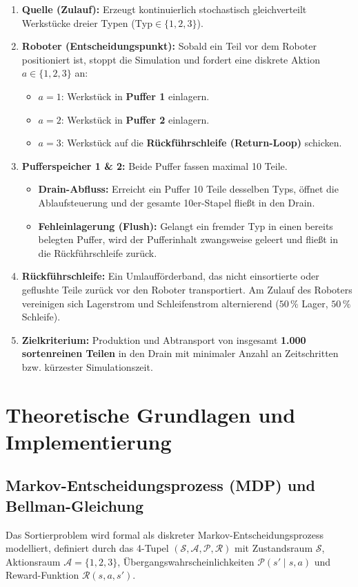 \documentclass[11pt,a4paper]{article}
\begin{document}
\begin{enumerate}
  \item \textbf{Quelle (Zulauf):} Erzeugt kontinuierlich stochastisch gleichverteilt Werkstücke dreier Typen ($\text{Typ} \in \{1, 2, 3\}$).
  \item \textbf{Roboter (Entscheidungspunkt):} Sobald ein Teil vor dem Roboter positioniert ist, stoppt die Simulation und fordert eine diskrete Aktion $a \in \{1, 2, 3\}$ an:
    \begin{itemize}
      \item $a=1$: Werkstück in \textbf{Puffer 1} einlagern.
      \item $a=2$: Werkstück in \textbf{Puffer 2} einlagern.
      \item $a=3$: Werkstück auf die \textbf{Rückführschleife (Return-Loop)} schicken.
    \end{itemize}
  \item \textbf{Pufferspeicher 1 \& 2:} Beide Puffer fassen maximal 10 Teile.
    \begin{itemize}
      \item \textbf{Drain-Abfluss:} Erreicht ein Puffer 10 Teile desselben Typs, öffnet die Ablaufsteuerung und der gesamte 10er-Stapel fließt in den Drain.
      \item \textbf{Fehleinlagerung (Flush):} Gelangt ein fremder Typ in einen bereits belegten Puffer, wird der Pufferinhalt zwangsweise geleert und fließt in die Rückführschleife zurück.
    \end{itemize}
  \item \textbf{Rückführschleife:} Ein Umlaufförderband, das nicht einsortierte oder geflushte Teile zurück vor den Roboter transportiert. Am Zulauf des Roboters vereinigen sich Lagerstrom und Schleifenstrom alternierend ($50\,\%$ Lager, $50\,\%$ Schleife).
  \item \textbf{Zielkriterium:} Produktion und Abtransport von insgesamt \textbf{1.000 sortenreinen Teilen} in den Drain mit minimaler Anzahl an Zeitschritten bzw. kürzester Simulationszeit.
\end{enumerate}

\section{Theoretische Grundlagen und Implementierung}

\subsection{Markov-Entscheidungsprozess (MDP) und Bellman-Gleichung}
Das Sortierproblem wird formal als diskreter Markov-Entscheidungsprozess modelliert, definiert durch das 4-Tupel $(\mathcal{S}, \mathcal{A}, \mathcal{P}, \mathcal{R})$ mit Zustandsraum $\mathcal{S}$, Aktionsraum $\mathcal{A} = \{1, 2, 3\}$, Übergangswahrscheinlichkeiten $\mathcal{P}(s' \mid s, a)$ und Reward-Funktion $\mathcal{R}(s, a, s')$.
\end{document}

